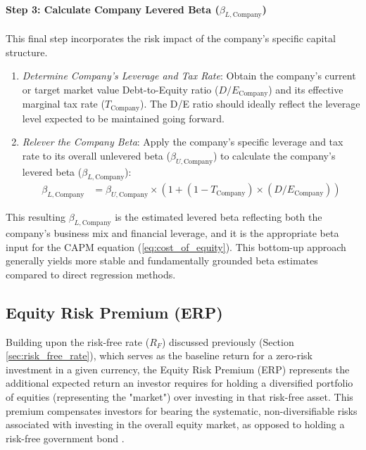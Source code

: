 \paragraph{Step 3: Calculate Company Levered Beta (\(\beta_{L, \text{Company}}\))}
This final step incorporates the risk impact of the company's specific capital structure.
\begin{enumerate}
    \item \textit{Determine Company's Leverage and Tax Rate}: Obtain the company's current or target market value Debt-to-Equity ratio (\(D/E_{\text{Company}}\)) and its effective marginal tax rate (\(T_{\text{Company}}\)). The D/E ratio should ideally reflect the leverage level expected to be maintained going forward.
    \item \textit{Relever the Company Beta}: Apply the company's specific leverage and tax rate to its overall unlevered beta (\(\beta_{U, \text{Company}}\)) to calculate the company's levered beta (\(\beta_{L, \text{Company}}\)):
          \begin{align*}
              \beta_{L, \text{Company}} & = \beta_{U, \text{Company}} \times (1 + (1 - T_{\text{Company}}) \times (D/E_{\text{Company}}))
          \end{align*}
\end{enumerate}

This resulting \(\beta_{L, \text{Company}}\) is the estimated levered beta reflecting both the company's business mix and financial leverage, and it is the appropriate beta input for the CAPM equation (\ref{eq:cost_of_equity}). This bottom-up approach generally yields more stable and fundamentally grounded beta estimates compared to direct regression methods.

\subsection{Equity Risk Premium (ERP)} \label{sec:erp}
Building upon the risk-free rate (\(R_F\)) discussed previously (Section \ref{sec:risk_free_rate}), which serves as the baseline return for a zero-risk investment in a given currency, the Equity Risk Premium (ERP) represents the additional expected return an investor requires for holding a diversified portfolio of equities (representing the "market") over investing in that risk-free asset. This premium compensates investors for bearing the systematic, non-diversifiable risks associated with investing in the overall equity market, as opposed to holding a risk-free government bond \parencite{damodaran2008erp}.

